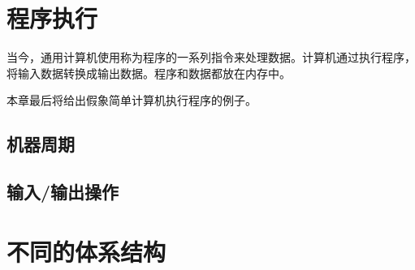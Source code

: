 \section{程序执行}
当今，通用计算机使用称为程序的一系列指令来处理数据。计算机通过执行程序，将输入数据转换成输出数据。程序和数据都放在内存中。

本章最后将给出假象简单计算机执行程序的例子。
\subsection{机器周期}
\subsection{输入/输出操作}
\section{不同的体系结构}
